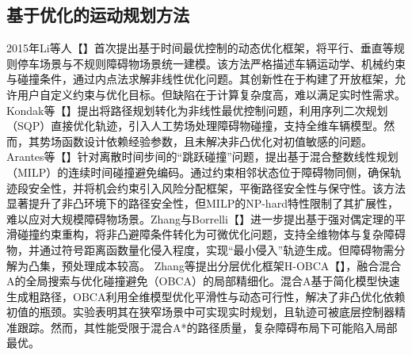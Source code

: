 \documentclass[master,academic]{ysuthesis} %
\begin{document}
		\subsection{基于优化的运动规划方法}
		2015年Li等人【】首次提出基于时间最优控制的动态优化框架，将平行、垂直等规则停车场景与不规则障碍物场景统一建模。该方法严格描述车辆运动学、机械约束与碰撞条件，通过内点法求解非线性优化问题。其创新性在于构建了开放框架，允许用户自定义约束与优化目标。但缺陷在于计算复杂度高，难以满足实时性需求。Kondak等【】提出将路径规划转化为非线性最优控制问题，利用序列二次规划（SQP）直接优化轨迹，引入人工势场处理障碍物碰撞，支持全维车辆模型。然而，其势场函数设计依赖经验参数，且未解决非凸优化对初值敏感的问题。 
		Arantes等【】针对离散时间步间的“跳跃碰撞”问题，提出基于混合整数线性规划（MILP）的连续时间碰撞避免编码。通过约束相邻状态位于障碍物同侧，确保轨迹段安全性，并将机会约束引入风险分配框架，平衡路径安全性与保守性。该方法显著提升了非凸环境下的路径安全性，但MILP的NP-hard特性限制了其扩展性，难以应对大规模障碍物场景。Zhang与Borrelli【】进一步提出基于强对偶定理的平滑碰撞约束重构，将非凸避障条件转化为可微优化问题，支持全维物体与复杂障碍物，并通过符号距离函数量化侵入程度，实现“最小侵入”轨迹生成。但障碍物需分解为凸集，预处理成本较高。
		Zhang等提出分层优化框架H-OBCA【】，融合混合A的全局搜索与优化碰撞避免（OBCA）的局部精细化。混合A基于简化模型快速生成粗路径，OBCA利用全维模型优化平滑性与动态可行性，解决了非凸优化依赖初值的瓶颈。实验表明其在狭窄场景中可实现实时规划，且轨迹可被底层控制器精准跟踪。然而，其性能受限于混合A*的路径质量，复杂障碍布局下可能陷入局部最优。
\end{document}
